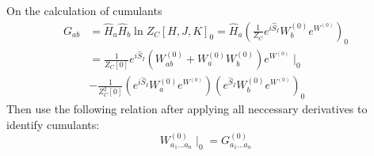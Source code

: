 \documentclass[10pt]{beamer}
\begin{document}
\begin{frame}{On the calculation of cumulants}
	\begin{align}
		G_{ab} &= \hat{ H}_a \hat{ H}_b \ln{Z_C [H, J, K]}_0 = \hat{ H}_a \left(\frac{1}{Z_C} e^{i \hat{S}_I} W^{(0)}_b e^{W^{(0)}}\right)_0\\
		&= \frac{1}{Z_C[0]} e^{i \hat{S}_I}\left(W^{(0)}_{ab} + W^{(0)}_a W^{(0)}_b\right)e^{W^{(0)}} \mid_0 \nonumber \\
		&-\frac{1}{Z^2_C[0]} \left(e^{i \hat{S}_I} W^{(0)}_a e^{W^{(0)}} \right) \left(e^{\hat{S}_I} W^{(0)}_b  e^{W^{(0)}}\right)_0
	\end{align}
	Then use the following relation after applying all neccessary derivatives to identify cumulants:
	\begin{equation}
	W^{(0)}_{a_1 \dots a_n} \mid_0 = G^{(0)}_{a_1 \dots a_n}
	\end{equation}
\end{frame}
\end{document}
